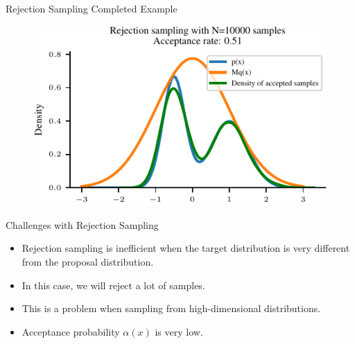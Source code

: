 \documentclass[handout]{beamer}
\begin{document}
    \begin{frame}{Rejection Sampling Completed Example}
        \begin{figure}
            \centering
            \includegraphics{notebooks/figures/sampling/rejection-sampling-N10000-True.pdf}
        \end{figure}
    \end{frame}
        

    \begin{frame}{Challenges with Rejection Sampling}
        \begin{itemize}
            \item Rejection sampling is inefficient when the target distribution is very different from the proposal distribution.
            \item In this case, we will reject a lot of samples.
            \item This is a problem when sampling from high-dimensional distributions.
            \item Acceptance probability $\alpha(x)$ is very low.
        \end{itemize}
        
    \end{frame}
    
\end{document}
